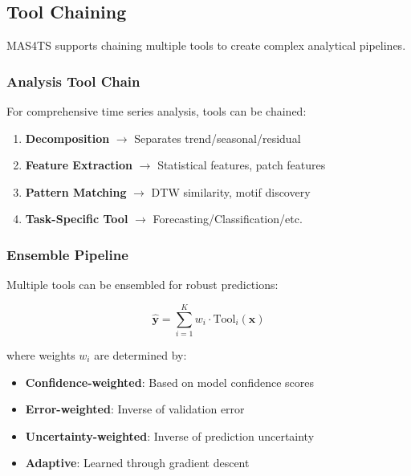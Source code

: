 \subsection{Tool Chaining}
\label{appx:tool_chaining}

MAS4TS supports chaining multiple tools to create complex analytical pipelines.

\subsubsection{Analysis Tool Chain}

For comprehensive time series analysis, tools can be chained:

\begin{enumerate}[leftmargin=*, itemsep=1pt]
    \item \textbf{Decomposition} $\rightarrow$ Separates trend/seasonal/residual
    \item \textbf{Feature Extraction} $\rightarrow$ Statistical features, patch features
    \item \textbf{Pattern Matching} $\rightarrow$ DTW similarity, motif discovery
    \item \textbf{Task-Specific Tool} $\rightarrow$ Forecasting/Classification/etc.
\end{enumerate}

\subsubsection{Ensemble Pipeline}

Multiple tools can be ensembled for robust predictions:

\begin{equation}
    \hat{\mathbf{y}} = \sum_{i=1}^{K} w_i \cdot \text{Tool}_i(\mathbf{x})
\end{equation}

where weights $w_i$ are determined by:
\begin{itemize}[leftmargin=*, itemsep=1pt]
    \item \textbf{Confidence-weighted}: Based on model confidence scores
    \item \textbf{Error-weighted}: Inverse of validation error
    \item \textbf{Uncertainty-weighted}: Inverse of prediction uncertainty
    \item \textbf{Adaptive}: Learned through gradient descent
\end{itemize}

